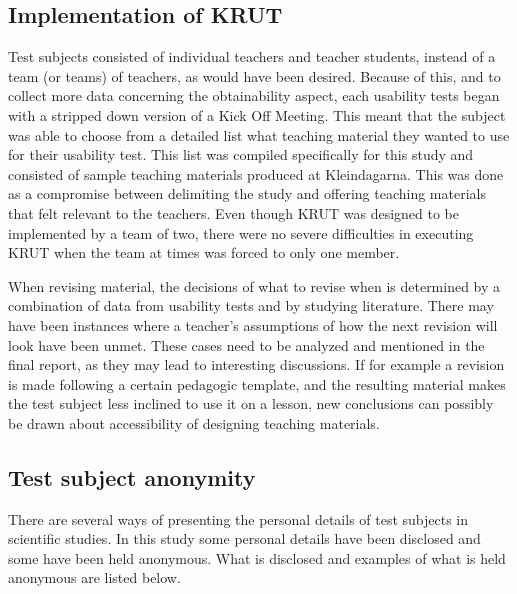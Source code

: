 \subsection{Implementation of KRUT}
Test subjects consisted of individual teachers and teacher students, instead of a team (or teams) of teachers, as would have been desired. Because of this, and to collect more data concerning the obtainability aspect, each usability tests began with a stripped down version of a Kick Off Meeting. This meant that the subject was able to choose from a detailed list what teaching material they wanted to use for their usability test. This list was compiled specifically for this study and consisted of sample teaching materials produced at  Kleindagarna. This was done as a compromise between delimiting the study and offering teaching materials that felt relevant to the teachers. Even though KRUT was designed to be implemented by a team of two, there were no severe difficulties in executing KRUT when the team at times was forced to only one member.

When revising material, the decisions of what to revise when is determined by a combination of data from usability tests and by studying literature. There may have been instances where a teacher’s assumptions of how the next revision will look have been unmet. These cases need to be analyzed and mentioned in the final report, as they may lead to interesting discussions. If for example a revision is made following a certain pedagogic template, and the resulting material makes the test subject less inclined to use it on a lesson, new conclusions can possibly be drawn about accessibility of designing teaching materials.


\subsection{Test subject anonymity} \label{subjectanonymity}
There are several ways of presenting the personal details of test subjects in scientific studies. In this study some personal details have been disclosed and some have been held anonymous. What is disclosed and examples of what is held anonymous are listed below.

